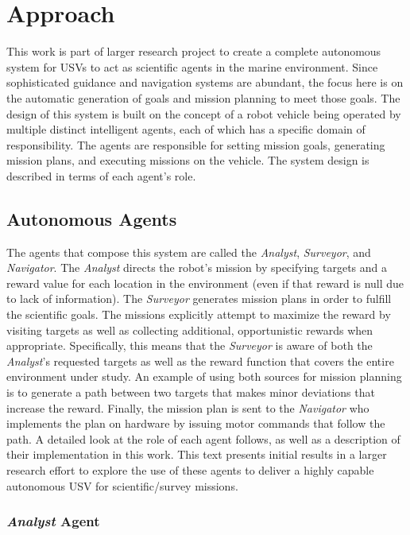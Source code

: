 \documentclass{tamuccthesis}
\begin{document}
\section{Approach}

This work is part of larger research project to create a complete autonomous system for USVs to act as scientific agents in the marine environment. Since sophisticated guidance and navigation systems are abundant, the focus here is on the automatic generation of goals and mission planning to meet those goals. The design of this system is built on the concept of a robot vehicle being operated by multiple distinct intelligent agents, each of which has a specific domain of responsibility. The agents are responsible for setting mission goals, generating mission plans, and executing missions on the vehicle. The system design is described in terms of each agent's role.

\subsection{Autonomous Agents}

The agents that compose this system are called the \textit{Analyst}, \textit{Surveyor}, and \textit{\textit{Navigator}}. The \textit{\textit{Analyst}} directs the robot's mission by specifying targets and a reward value for each location in the environment (even if that reward is null due to lack of information). The \textit{\textit{Surveyor}} generates mission plans in order to fulfill the scientific goals. The missions explicitly attempt to maximize the reward by visiting targets as well as collecting additional, opportunistic rewards when appropriate. Specifically, this means that the \textit{Surveyor} is aware of both the \textit{Analyst}'s requested targets as well as the reward function that covers the entire environment under study. An example of using both sources for mission planning is to generate a path between two targets that makes minor deviations that increase the reward. Finally, the mission plan is sent to the \textit{\textit{\textit{Navigator}}} who implements the plan on hardware by issuing motor commands that follow the path. A detailed look at the role of each agent follows, as well as a description of their implementation in this work. This text presents initial results in a larger research effort to explore the use of these agents to deliver a highly capable autonomous USV for scientific/survey missions. 

\subsubsection{\textit{Analyst} Agent}
\end{document}
